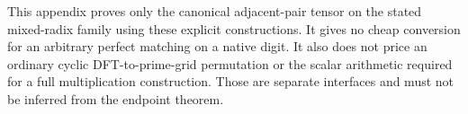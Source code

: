 This appendix proves only the canonical adjacent-pair tensor on the
stated mixed-radix family using these explicit constructions.
It gives no cheap conversion for an arbitrary perfect
matching on a native digit.  It also does not price an ordinary cyclic
DFT-to-prime-grid permutation or the scalar arithmetic required for a
full multiplication construction.  Those are separate interfaces and
must not be inferred from the endpoint theorem.



